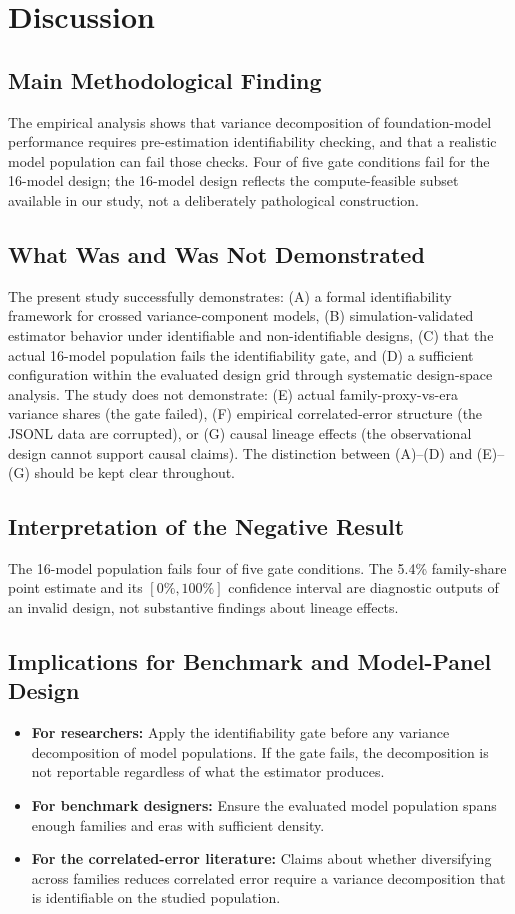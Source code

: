 \documentclass{ieeeaccess}
\theoremstyle{definition}
\theoremstyle{plain}
\begin{document}
\section{Discussion}
\label{sec:discussion}

\subsection{Main Methodological Finding}
The empirical analysis shows that variance decomposition of foundation-model performance requires pre-estimation identifiability checking, and that a realistic model population can fail those checks. Four of five gate conditions fail for the 16-model design; the 16-model design reflects the compute-feasible subset available in our study, not a deliberately pathological construction.

\subsection{What Was and Was Not Demonstrated}
The present study successfully demonstrates: (A) a formal identifiability framework for crossed variance-component models, (B) simulation-validated estimator behavior under identifiable and non-identifiable designs, (C) that the actual 16-model population fails the identifiability gate, and (D) a sufficient configuration within the evaluated design grid through systematic design-space analysis. The study does not demonstrate: (E) actual family-proxy-vs-era variance shares (the gate failed), (F) empirical correlated-error structure (the JSONL data are corrupted), or (G) causal lineage effects (the observational design cannot support causal claims). The distinction between (A)--(D) and (E)--(G) should be kept clear throughout.

\subsection{Interpretation of the Negative Result}
The 16-model population fails four of five gate conditions. The 5.4\% family-share point estimate and its $[0\%, 100\%]$ confidence interval are diagnostic outputs of an invalid design, not substantive findings about lineage effects.

\subsection{Implications for Benchmark and Model-Panel Design}
\begin{itemize}
\item \textbf{For researchers:} Apply the identifiability gate before any variance decomposition of model populations. If the gate fails, the decomposition is not reportable regardless of what the estimator produces.
\item \textbf{For benchmark designers:} Ensure the evaluated model population spans enough families and eras with sufficient density.
\item \textbf{For the correlated-error literature:} Claims about whether diversifying across families reduces correlated error require a variance decomposition that is identifiable on the studied population.
\end{itemize}
\end{document}
